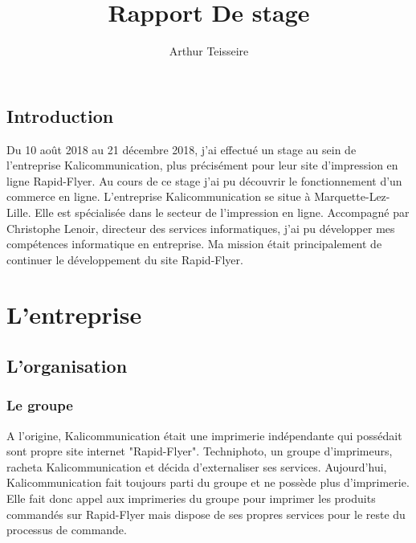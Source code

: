 \documentclass[a4paper]{report}
\title{Rapport De stage}
\author{Arthur Teisseire}
\begin{document}
\renewcommand{\contentsname}{Sommaire}
\renewcommand{\thesection}{\arabic{section}}
\tableofcontents
\chapter*{Introduction}
 
Du 10 août 2018 au 21 décembre 2018, j'ai effectué un stage au sein de l'entreprise Kalicommunication, plus précisément pour leur site d'impression en ligne Rapid-Flyer. Au cours de ce stage j'ai pu découvrir le fonctionnement d'un commerce en ligne.\newline
L'entreprise Kalicommunication se situe à Marquette-Lez-Lille. Elle est spécialisée dans le secteur de l'impression en ligne.\newline
Accompagné par Christophe Lenoir, directeur des services informatiques, j'ai pu développer mes compétences informatique en entreprise. Ma mission était principalement de continuer le développement du site Rapid-Flyer.
\part{L'entreprise}
\chapter*{L'organisation}
\section{Le groupe}
A l'origine, Kalicommunication était une imprimerie indépendante qui possédait sont propre site internet "Rapid-Flyer". Techniphoto, un groupe d'imprimeurs, racheta Kalicommunication et décida d'externaliser ses services. Aujourd'hui, Kalicommunication fait toujours parti du groupe et ne possède plus d'imprimerie. Elle fait donc appel aux imprimeries du groupe pour imprimer les produits commandés sur Rapid-Flyer mais dispose de ses propres services pour le reste du processus de commande.
\end{document}
